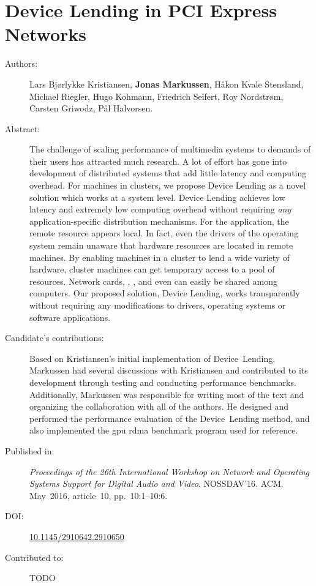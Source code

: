 \chapter{Device Lending in PCI Express Networks}
\label{paper:nossdav}
\paperthumb

\begin{description}
	\item[Authors:]
		Lars Bj{\o}rlykke Kristiansen, \textbf{Jonas Markussen}, H{\aa}kon Kvale Stensland,
		Michael Riegler, Hugo Kohmann, Friedrich Seifert, Roy Nordstr{\o}m, Carsten Griwodz, P{\aa}l Halvorsen.

	\item[Abstract:]
		The challenge of scaling  performance of multimedia systems to demands
		of their users has attracted much research.
		A lot of effort has gone into
		development of distributed systems that add little latency and computing overhead.
		For machines in  clusters,
		we propose Device Lending as a novel solution which works at a system
		level.
		Device Lending achieves low latency and extremely low computing overhead without
		requiring \textit{any} application-specific distribution mechanisms.
		For the application, the remote  resource appears local.
		In fact, even the drivers of the operating system remain unaware that
		hardware resources are located in remote machines.
		By enabling machines in a  cluster to lend a wide variety of hardware, 
		cluster machines can get temporary access to a pool of  resources. 
		Network cards, , , and even  can easily 
		be shared among computers.
		Our proposed solution, Device Lending, works transparently without requiring any modifications to drivers,
		operating systems or software applications.

	\item[Candidate's contributions:]
	    Based on Kristiansen's initial implementation of Device~Lending, Markussen had several discussions with Kristiansen and contributed to its development through testing and conducting performance benchmarks.
		Additionally, Markussen was responsible for writing most of the text and organizing the collaboration with all of the authors.
		He designed and performed the performance evaluation of the Device~Lending method, and also implemented the \acrshort{gpu} \acrshort{rdma} benchmark program used for reference.
		

	\item[Published in:]
		\emph{Proceedings of the 26th International Workshop on Network and Operating Systems Support for Digital Audio and Video}.
		NOSSDAV'16. ACM.
		May~2016, article~10, pp.~10:1--10:6.

	\item[DOI:] \href{https://doi.org/10.1145/2910642.2910650}{10.1145/2910642.2910650}

	\item[Contributed to:]
		TODO

\end{description}

